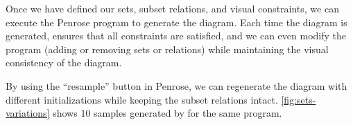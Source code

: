 Once we have defined our sets, subset relations, and visual constraints, we can execute the Penrose program to generate the diagram. Each time the diagram is generated, \Penrose ensures that all constraints are satisfied, and we can even modify the \Substance program (\eg adding or removing sets or relations) while maintaining the visual consistency of the diagram.

By using the ``resample'' button in Penrose, we can regenerate the diagram with different initializations while keeping the subset relations intact. \cref{fig:sets-variations} shows 10 samples generated by \Penrose for the same \Substance program.
